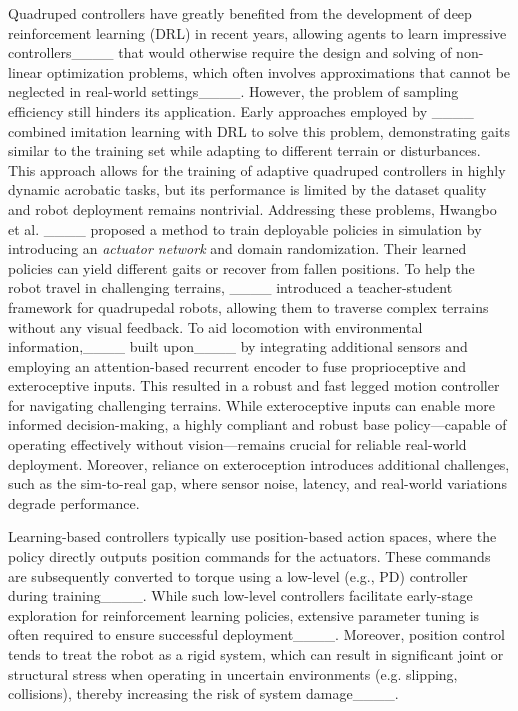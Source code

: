Quadruped controllers have greatly benefited from the development of deep reinforcement learning (DRL) in recent years, allowing agents to learn impressive controllers____ that would otherwise require the design and solving of non-linear optimization problems, which often involves approximations that cannot be neglected in real-world settings____.
However, the problem of sampling efficiency still hinders its application.
Early approaches employed by ____ combined imitation learning with DRL to solve this problem, demonstrating gaits similar to the training set while adapting to different terrain or disturbances.
This approach allows for the training of adaptive quadruped controllers in highly dynamic acrobatic tasks, but its performance is limited by the dataset quality and robot deployment remains nontrivial.
Addressing these problems, Hwangbo et al. ____ proposed a method to train deployable policies in simulation by introducing an \textit{actuator network} and domain randomization.
Their learned policies can yield different gaits or recover from fallen positions.
To help the robot travel in challenging terrains, ____ introduced a teacher-student framework for quadrupedal robots, allowing them to traverse complex terrains without any visual feedback.
To aid locomotion with environmental information,____ built upon____ by integrating additional sensors and employing an attention-based recurrent encoder to fuse proprioceptive and exteroceptive inputs. This resulted in a robust and fast legged motion controller for navigating challenging terrains.
While exteroceptive inputs can enable more informed decision-making, a highly compliant and robust base policy—capable of operating effectively without vision—remains crucial for reliable real-world deployment. Moreover, reliance on exteroception introduces additional challenges, such as the sim-to-real gap, where sensor noise, latency, and real-world variations degrade performance. 

Learning-based controllers typically use position-based action spaces, where the policy directly outputs position commands for the actuators.
These commands are subsequently converted to torque using a low-level (e.g., PD)  controller during training____.
While such low-level controllers facilitate early-stage exploration for reinforcement learning policies, extensive parameter tuning is often required to ensure successful deployment____.
Moreover, position control tends to treat the robot as a rigid system, which can result in significant joint or structural stress when operating in uncertain environments (e.g. slipping, collisions), thereby increasing the risk of system damage____. 

